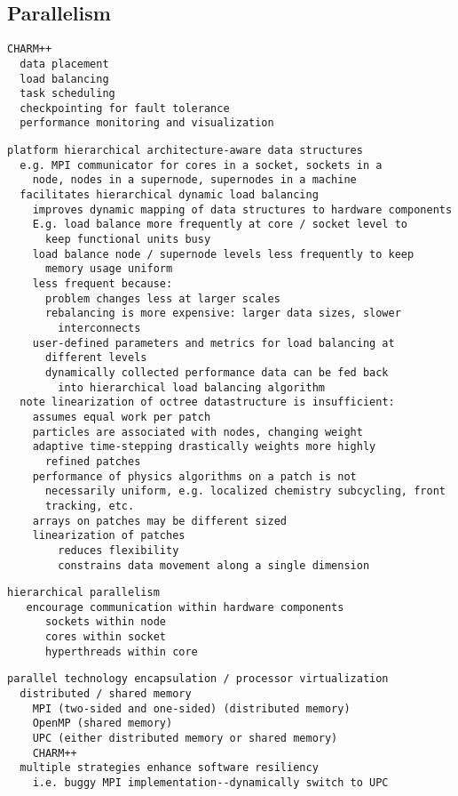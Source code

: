 \documentclass[14pt,letter]{article}
\begin{document}
\subsection{Parallelism} \label{ss:parallelism}

\begin{verbatim}
CHARM++ 
  data placement
  load balancing
  task scheduling
  checkpointing for fault tolerance
  performance monitoring and visualization
\end{verbatim}

\begin{verbatim}
platform hierarchical architecture-aware data structures
  e.g. MPI communicator for cores in a socket, sockets in a
    node, nodes in a supernode, supernodes in a machine
  facilitates hierarchical dynamic load balancing
    improves dynamic mapping of data structures to hardware components
    E.g. load balance more frequently at core / socket level to
      keep functional units busy
    load balance node / supernode levels less frequently to keep
      memory usage uniform
    less frequent because:
      problem changes less at larger scales
      rebalancing is more expensive: larger data sizes, slower
        interconnects
    user-defined parameters and metrics for load balancing at
      different levels
      dynamically collected performance data can be fed back
        into hierarchical load balancing algorithm
  note linearization of octree datastructure is insufficient:
    assumes equal work per patch
    particles are associated with nodes, changing weight
    adaptive time-stepping drastically weights more highly
      refined patches
    performance of physics algorithms on a patch is not
      necessarily uniform, e.g. localized chemistry subcycling, front
      tracking, etc.
    arrays on patches may be different sized
    linearization of patches 
        reduces flexibility
        constrains data movement along a single dimension
\end{verbatim}

\begin{verbatim}
hierarchical parallelism
   encourage communication within hardware components
      sockets within node
      cores within socket
      hyperthreads within core
\end{verbatim}

\begin{verbatim}
parallel technology encapsulation / processor virtualization
  distributed / shared memory
    MPI (two-sided and one-sided) (distributed memory)
    OpenMP (shared memory) 
    UPC (either distributed memory or shared memory)
    CHARM++
  multiple strategies enhance software resiliency
    i.e. buggy MPI implementation--dynamically switch to UPC
\end{verbatim}
\end{document}
